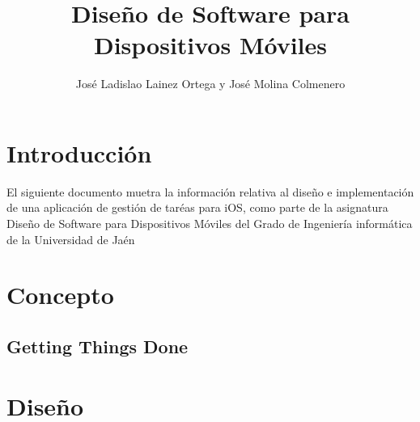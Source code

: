 \documentclass[parskip=half*]{scrartcl}
\title{Dise\~no de Software para Dispositivos M\'oviles}
\author{Jos\'e Ladislao Lainez Ortega y Jos\'e Molina Colmenero}
\begin{document}

\maketitle
\tableofcontents

\newpage


\section{Introducci\'on}
El siguiente documento muetra la información relativa al diseño e implementación de una aplicación de gestión de taréas para iOS, como parte de la asignatura Diseño de Software para Dispositivos Móviles del Grado de Ingeniería informática de la Universidad de Jaén
\section{Concepto}

\subsection{Getting Things Done}

\section{Dise\~no}




\printindex
\end{document}
